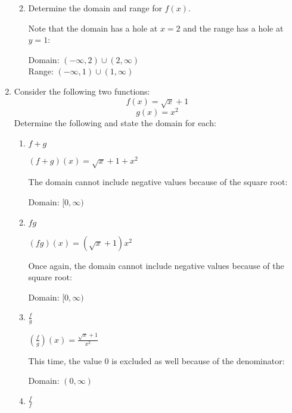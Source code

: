 \documentclass[letterpaper,12pt,fleqn]{article}
\begin{document}
\begin{enumerate}
\begin{enumerate}

  \item Determine the domain and range for $f(x)$.

    Note that the domain has a hole at $x=2$ and the range has a hole at
    $y=1$:
    
    Domain: $(-\infty,2)\cup(2,\infty)$ \\
    Range: $(-\infty,1)\cup(1,\infty)$
  \end{enumerate}

\item Consider the following two functions:
  \[f(x)=\sqrt{x}+1\]
  \[g(x)=x^2\]
  Determine the following and state the domain for each:
  \begin{enumerate}
  \item $f+g$

    $(f+g)(x)=\sqrt{x}+1+x^2$

    The domain cannot include negative values because of the square root:

    Domain: $[0,\infty)$
      
  \item $fg$

    $(fg)(x) = (\sqrt{x}+1)x^2$
    
    Once again, the domain cannot include negative values because of the
    square root:

    Domain: $[0,\infty)$

  \item $\frac{f}{g}$

    $\left(\frac{f}{g}\right)(x)=\frac{\sqrt{x}+1}{x^2}$

    This time, the value 0 is excluded as well because of the denominator:
    
    Domain: $(0,\infty)$
      
  \item $\frac{f}{f}$


\end{enumerate}
\end{enumerate}
\end{document}
